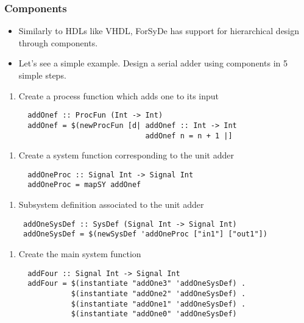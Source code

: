 \documentclass{beamer}
\begin{document}
\begin{frame}[fragile]
  \frametitle{Components}
  \begin{itemize}
  \item Similarly to HDLs like VHDL, ForSyDe has support for
    hierarchical design through components.  
  \item
  Let's see a simple example. Design a serial adder using components in 5 
  simple steps.
  \end{itemize}
  
  
  \vspace{-0.7cm}
  \begin{overprint}
   \begin{enumerate}[1)]
   \item Create a process function which adds one to its input 
    \begin{lstlisting}
  addOnef :: ProcFun (Int -> Int)
  addOnef = $(newProcFun [d| addOnef :: Int -> Int 
                             addOnef n = n + 1 |]
    \end{lstlisting}
    \end{enumerate}
   
   \begin{enumerate}[2)]
   \item Create a system function corresponding to the unit adder
   \begin{lstlisting}
  addOneProc :: Signal Int -> Signal Int
  addOneProc = mapSY addOnef
   \end{lstlisting}
   \end{enumerate}
   
   \begin{enumerate}[3)]
   \item Subsystem definition associated to the unit adder
   \begin{lstlisting}
 addOneSysDef :: SysDef (Signal Int -> Signal Int)
 addOneSysDef = $(newSysDef 'addOneProc ["in1"] ["out1"])
   \end{lstlisting}
   \end{enumerate}


   \begin{enumerate}[4)]
   \item Create the main system function
   \begin{lstlisting}
  addFour :: Signal Int -> Signal Int
  addFour = $(instantiate "addOne3" 'addOneSysDef) .
            $(instantiate "addOne2" 'addOneSysDef) .
            $(instantiate "addOne1" 'addOneSysDef) .
            $(instantiate "addOne0" 'addOneSysDef)
   \end{lstlisting}
   \end{enumerate}


\end{overprint}
\end{frame}
\end{document}
